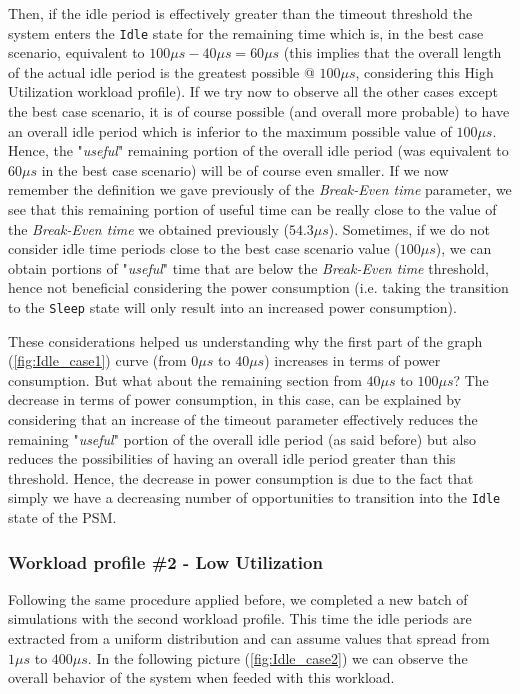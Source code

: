 \documentclass[a4paper]{article}
\begin{document}
            Then, if the idle period is effectively greater than the timeout threshold the system enters the \texttt{Idle} state for the remaining time which is, in the best case scenario, equivalent to $100 \mu s - 40 \mu s = 60 \mu s$ (this implies that the overall length of the actual idle period is the greatest possible @ $100 \mu s$, considering this High Utilization workload profile).
            If we try now to observe all the other cases except the best case scenario, it is of course possible (and overall more probable) to have an overall idle period which is inferior to the maximum possible value of $100 \mu s$. Hence, the "\emph{useful}" remaining portion of the overall idle period (was equivalent to $60 \mu s$ in the best case scenario) will be of course even smaller.
            If we now remember the definition we gave previously of the \emph{Break-Even time} parameter, we see that this remaining portion of useful time can be really close to the value of the \emph{Break-Even time} we obtained previously ($54.3 \mu s$). Sometimes, if we do not consider idle time periods close to the best case scenario value ($100 \mu s$), we can obtain portions of "\emph{useful}" time that are below the \emph{Break-Even time} threshold, hence not beneficial considering the power consumption (i.e. taking the transition to the \texttt{Sleep} state will only result into an increased power consumption).

            These considerations helped us understanding why the first part of the graph (\ref{fig:Idle_case1}) curve (from $0 \mu s$ to $40 \mu s$) increases in terms of power consumption. But what about the remaining section from $40 \mu s$ to $100 \mu s$?
            The decrease in terms of power consumption, in this case, can be explained by considering that an increase of the timeout parameter effectively reduces the remaining "\emph{useful}" portion of the overall idle period (as said before) but also reduces the possibilities of having an overall idle period greater than this threshold. Hence, the decrease in power consumption is due to the fact that simply we have a decreasing number of opportunities to transition into the \texttt{Idle} state of the PSM.

        \subsubsection{Workload profile \#2 - Low Utilization}
            Following the same procedure applied before, we completed a new batch of simulations with the second workload profile. This time the idle periods are extracted from a uniform distribution and can assume values that spread from $1 \mu s$ to $400 \mu s$.
            In the following picture (\ref{fig:Idle_case2}) we can observe the overall behavior of the system when feeded with this workload.
\end{document}
